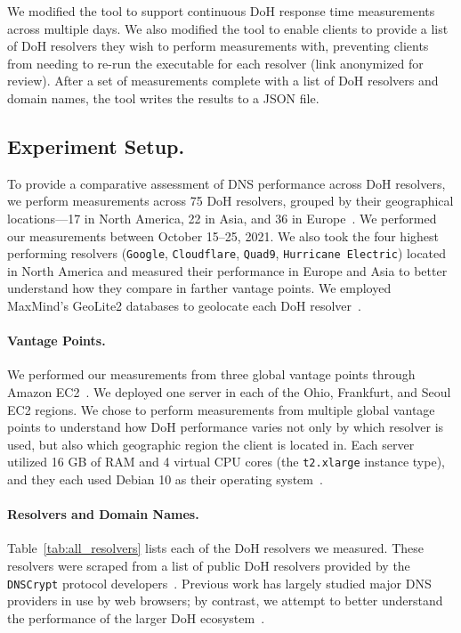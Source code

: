 We modified the tool to support continuous DoH response time measurements
across multiple days.  We also modified the tool to enable clients to provide
a list of DoH resolvers they wish to perform measurements with, preventing
clients from needing to re-run the executable for each resolver (link
anonymized for review).  After a set of measurements complete with a list of
DoH resolvers and domain names, the tool writes the results to a JSON file.

\subsection{Experiment Setup.} To provide a comparative assessment of DNS
performance across DoH resolvers, we perform measurements across 75 DoH
resolvers, grouped by their geographical locations—17 in North America, 22 in
Asia, and 36 in Europe~\cite{dnscrypt}.  We performed our measurements between
October 15--25, 2021.  We also took the four highest
performing resolvers (\texttt{Google}, \texttt{Cloudflare}, \texttt{Quad9},
\texttt{Hurricane Electric}) located in North America and measured their
performance in Europe and Asia to better understand how they compare in
farther vantage points.  We employed MaxMind's GeoLite2 databases to geolocate
each DoH resolver~\cite{maxmind}.

\paragraph{Vantage Points.} We performed our measurements from three global
vantage points through Amazon EC2~\cite{amazon_ec2}.  We deployed one server
in each of the Ohio, Frankfurt, and Seoul EC2 regions.  We chose to perform
measurements from multiple global vantage points to understand how DoH
performance varies not only by which resolver is used, but also which
geographic region the client is located in.  Each server utilized 16 GB of RAM
and 4 virtual CPU cores (the \texttt{t2.xlarge} instance type), and they each
used Debian 10 as their operating system~\cite{amazon_ec2_instance_types}.

\paragraph{Resolvers and Domain Names.} Table~\ref{tab:all_resolvers} 
lists each of the DoH resolvers we measured.  These resolvers were
scraped from a list of public DoH resolvers provided by the \texttt{DNSCrypt}
protocol developers~\cite{dnscrypt-public-resolvers}.  Previous work has
largely studied major DNS providers in use by web browsers; by contrast, we
attempt to better understand the performance of the larger DoH
ecosystem~\cite{hounsel2020comparing,hounsel2021can}.

